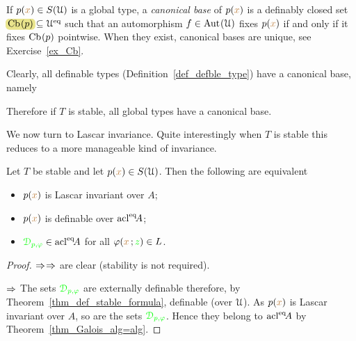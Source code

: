 \documentclass[creche.tex]{subfiles}
\begin{document}
If $p({\color{brown} x})\in S(\EuScript U)$ is a global type, a \emph{canonical base\/} of $p({\color{brown} x})$ is a definably closed set $\emph{$\Cb(p)$}\subseteq \U^\eq$ such that an automorphism $f\in{\rm Aut\kern.15ex}(\EuScript U)$ fixes $p({\color{brown} x})$ if and only if it fixes ${\rm Cb\kern.15ex}(p)$ pointwise. When they exist, canonical bases are unique, see Exercise~\ref{ex_Cb}.

Clearly, all definable types (Definition~\ref{def_defble_type}) have a canonical base, namely


Therefore if $T$ is stable, all global types have a canonical base.

We now turn to Lascar invariance. Quite interestingly when $T$ is stable this reduces to a more manageable kind of invariance.

\begin{proposition}\label{prop_type_over_acl2} Let $T$ be stable and let $p({\color{brown} x})\in S(\EuScript U)$. Then the following are equivalent
\begin{itemize}
\item[1.] $p({\color{brown} x})$ is Lascar invariant over $A$;
\item[2.] $p({\color{brown} x})$ is definable over ${\rm acl}^{{\rm eq}}\!A$;
\item[3.] ${\color{green}\EuScript D_{p,\varphi}}\in {\rm acl}^{{\rm eq}}\!A$ for all $\varphi({\color{brown} x}\,;{\color{green} z})\in L$.
\end{itemize}
\end{proposition}
\begin{proof}
 $\Rightarrow$$\Rightarrow$ are clear (stability is not required).
 
 $\Rightarrow$ The sets ${\color{green}\EuScript D_{p,\varphi}}$ are externally definable therefore, by Theorem~\ref{thm_def_stable_formula}, definable (over $\EuScript U$). As $p({\color{brown} x})$ is Lascar invariant over $A$, so are the sets ${\color{green}\EuScript D_{p,\varphi}}$. Hence they belong to ${\rm acl}^{{\rm eq}}\!A$ by Theorem~\ref{thm_Galois_alg=alg}.
\end{proof}
% 
\end{document}

